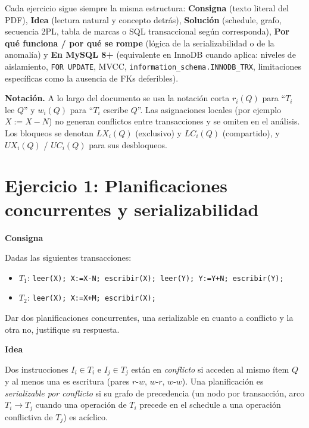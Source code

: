 \documentclass[11pt,a4paper]{article}
\newcommand{\itemcabecera}[1]{\noindent\textbf{#1}\par\medskip}
\newcommand{\bloqueConsigna}{\itemcabecera{Consigna}}
\newcommand{\bloqueIdea}{\itemcabecera{Idea}}
\begin{document}
Cada ejercicio sigue siempre la misma estructura: \textbf{Consigna} (texto literal del PDF), \textbf{Idea} (lectura natural y concepto detrás), \textbf{Solución} (schedule, grafo, secuencia 2PL, tabla de marcas o SQL transaccional según corresponda), \textbf{Por qué funciona / por qué se rompe} (lógica de la serializabilidad o de la anomalía) y \textbf{En MySQL 8+} (equivalente en InnoDB cuando aplica: niveles de aislamiento, \texttt{FOR UPDATE}, MVCC, \texttt{information\_schema.INNODB\_TRX}, limitaciones específicas como la ausencia de FKs deferibles).

\begin{nota}
\textbf{Notación.} A lo largo del documento se usa la notación corta $r_i(Q)$ para ``$T_i$ lee $Q$'' y $w_i(Q)$ para ``$T_i$ escribe $Q$''. Las asignaciones locales (por ejemplo $X := X - N$) no generan conflictos entre transacciones y se omiten en el análisis. Los bloqueos se denotan $LX_i(Q)$ (exclusivo) y $LC_i(Q)$ (compartido), y $UX_i(Q)$ / $UC_i(Q)$ para sus desbloqueos.
\end{nota}

\section{Ejercicio 1: Planificaciones concurrentes y serializabilidad}

\bloqueConsigna

Dadas las siguientes transacciones:

\begin{itemize}
    \item $T_1$: \texttt{leer(X); X:=X-N; escribir(X); leer(Y); Y:=Y+N; escribir(Y);}
    \item $T_2$: \texttt{leer(X); X:=X+M; escribir(X);}
\end{itemize}

Dar dos planificaciones concurrentes, una serializable en cuanto a conflicto y la otra no, justifique su respuesta.

\bloqueIdea

Dos instrucciones $I_i \in T_i$ e $I_j \in T_j$ están en \emph{conflicto} si acceden al mismo ítem $Q$ y al menos una es escritura (pares $r$-$w$, $w$-$r$, $w$-$w$). Una planificación es \emph{serializable por conflicto} si su grafo de precedencia (un nodo por transacción, arco $T_i \to T_j$ cuando una operación de $T_i$ precede en el schedule a una operación conflictiva de $T_j$) es acíclico.
\end{document}

